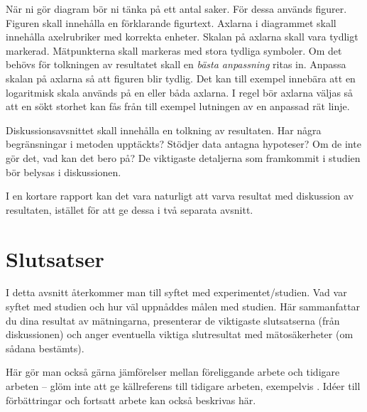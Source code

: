 \documentclass[a4paper,nologo]{miunart} %
\begin{document}
När ni gör diagram bör ni tänka på ett antal saker.
För dessa används figurer.
Figuren skall innehålla en förklarande figurtext.
Axlarna i diagrammet skall innehålla axelrubriker med korrekta enheter.
Skalan på axlarna skall vara tydligt markerad.
Mätpunkterna skall markeras med stora tydliga symboler.
Om det behövs för tolkningen av resultatet skall en \emph{bästa anpassning}
ritas in.
Anpassa skalan på axlarna så att figuren blir tydlig.
Det kan till exempel innebära att en logaritmisk skala används på en eller båda 
axlarna.
I regel bör axlarna väljas så att en sökt storhet kan fås från till exempel 
lutningen av en anpassad rät linje.

Diskussionsavsnittet skall innehålla en tolkning av resultaten.
Har några begränsningar i metoden upptäckts?
Stödjer data antagna hypoteser?
Om de inte gör det, vad kan det bero på?
De viktigaste detaljerna som framkommit i studien bör belysas i diskussionen.

I en kortare rapport kan det vara naturligt att varva resultat med diskussion 
av resultaten, istället för att ge dessa i två separata avsnitt.


\section{Slutsatser}
\label{sec:conclusion}
I detta avsnitt återkommer man till syftet med experimentet/studien.
Vad var syftet med studien och hur väl uppnåddes målen med studien.
Här sammanfattar du dina resultat av mätningarna, presenterar de viktigaste 
slutsatserna (från diskussionen) och anger eventuella viktiga slutresultat med 
mätosäkerheter (om sådana bestämts).

Här gör man också gärna jämförelser mellan föreliggande arbete och tidigare 
arbeten -- glöm inte att ge källreferens till tidigare arbeten, exempelvis 
\cite{Knuth1989arr}.
Idéer till förbättringar och fortsatt arbete kan också beskrivas här.



\end{document}

